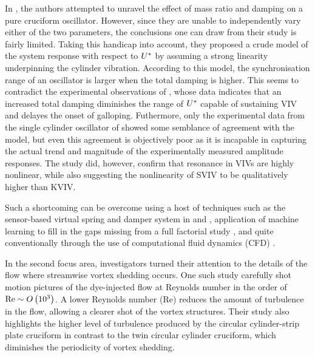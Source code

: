 \documentclass[oneside]{utmthesis}
\begin{document}
In \citet{Nguyen2012}, the authors attempted to unravel the effect of mass ratio and damping on a pure cruciform oscillator. However, since they are unable to independently vary either of the two parameters, the conclusions one can draw from their study is fairly limited. Taking this handicap into account, they proposed a crude model of the system response with respect to $U^{*}$ by assuming a strong linearity underpinning the cylinder vibration. According to this model, the synchronisation range of an oscillator is larger when the total damping is higher. This seems to contradict the experimental observations of \citet{Sun2016}, whose data indicates that an increased total damping diminishes the range of $U^{*}$ capable of sustaining VIV and delayes the onset of galloping. Futhermore, only the experimental data from the single cylinder oscillator of \citet{Nguyen2012} showed some semblance of agreement with the model, but even this agreement is objectively poor as it is incapable in capturing the actual trend and magnitude of the experimentally measured amplitude responses. The study did, however, confirm that resonance in VIVs are highly nonlinear, while also suggesting the nonlinearity of SVIV to be qualitatively higher than KVIV.

Such a shortcoming can be overcome using a host of techniques such as the sensor-based virtual spring and damper system in \citet{Garcia2018} and \citet{Sun2018}, application of machine learning to fill in the gaps missing from a full factorial study \citep{Hu2020}, and quite conventionally through the use of computational fluid dynamics (CFD) \citep{Zhang2018a}.

In the second focus area, investigators turned their attention to the details of the flow where streamwise vortex shedding occurs. One such study carefully shot motion pictures of the dye-injected flow \citep{Koide2017} at Reynolds number in the order of $\text{Re} \sim O\left( 10^{3} \right)$. A lower Reynolds number (Re) reduces the amount of turbulence in the flow, allowing a clearer shot of the vortex structures. Their study also highlights the higher level of turbulence produced by the circular cylinder-strip plate cruciform in contrast to the twin circular cylinder cruciform, which diminishes the periodicity of vortex shedding.
\end{document}
